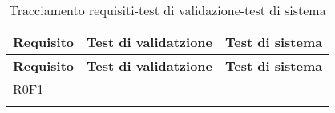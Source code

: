\def\arraystretch{1.5}
\begin{longtable}{p{2cm}!{\VRule[1pt]}p{4cm}!{\VRule[1pt]}p{4cm}!{\VRule[1pt]}}
\color{white} \textbf{Requisito} & \color{white} \textbf{Test di validatzione} & \color{white} \textbf{Test di sistema} \\ 
\endfirsthead 
{} 
\color{white} \textbf{Requisito} & \color{white} \textbf{Test di validatzione} & \color{white} \textbf{Test di sistema} \\ 
\endhead 
R0F1 &  &  \\ 
\caption{Tracciamento requisiti-test di validazione-test di sistema}
\end{longtable}